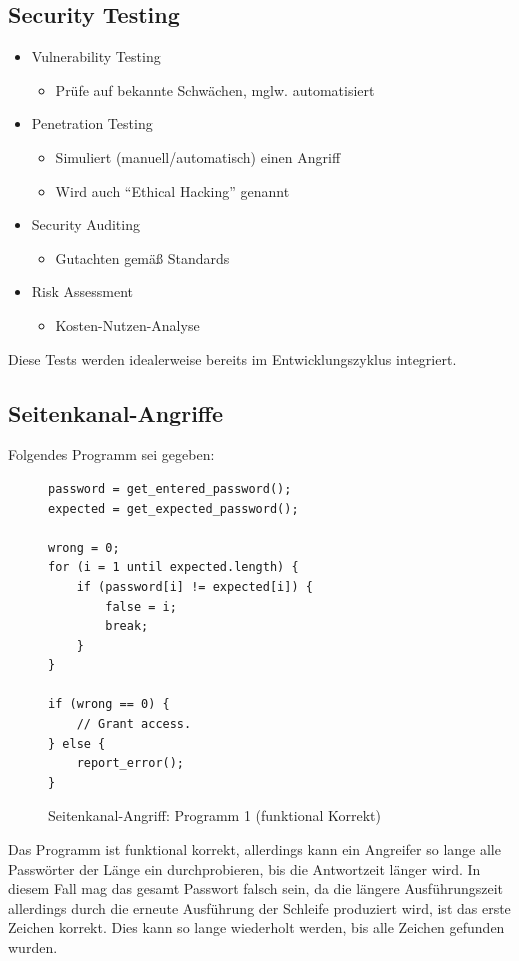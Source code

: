 \documentclass[a4paper, 11pt, accentcolor = tud3b]{tudreport}
\begin{document}
            \subsection{Security Testing}
                \begin{itemize}
                	\item Vulnerability Testing
	                	\begin{itemize}
	                		\item Prüfe auf bekannte Schwächen, mglw. automatisiert
	                	\end{itemize}
                	\item Penetration Testing
	                	\begin{itemize}
	                		\item Simuliert (manuell/automatisch) einen Angriff
	                		\item Wird auch \enquote{Ethical Hacking} genannt
	                	\end{itemize}
                	\item Security Auditing
	                	\begin{itemize}
	                		\item Gutachten gemäß Standards
	                	\end{itemize}
                	\item Risk Assessment
	                	\begin{itemize}
	                		\item Kosten-Nutzen-Analyse
	                	\end{itemize}
                \end{itemize}
	            Diese Tests werden idealerweise bereits im Entwicklungszyklus integriert.
            
            \subsection{Seitenkanal-Angriffe}
	            Folgendes Programm sei gegeben:
	            \begin{figure}[H]
	            	\centering
	            	\begin{lstlisting}
password = get_entered_password();
expected = get_expected_password();

wrong = 0;
for (i = 1 until expected.length) {
	if (password[i] != expected[i]) {
		false = i;
		break;
	}
}

if (wrong == 0) {
	// Grant access.
} else {
	report_error();
}
\end{lstlisting}
	            	\caption{Seitenkanal-Angriff: Programm 1 (funktional Korrekt)}
	            \end{figure}
	            Das Programm ist funktional korrekt, allerdings kann ein Angreifer so lange alle Passwörter der Länge ein durchprobieren, bis die Antwortzeit länger wird. In diesem Fall mag das gesamt Passwort falsch sein, da die längere Ausführungszeit allerdings durch die erneute Ausführung der Schleife produziert wird, ist das erste Zeichen korrekt. Dies kann so lange wiederholt werden, bis alle Zeichen gefunden wurden.
	            
\end{document}
